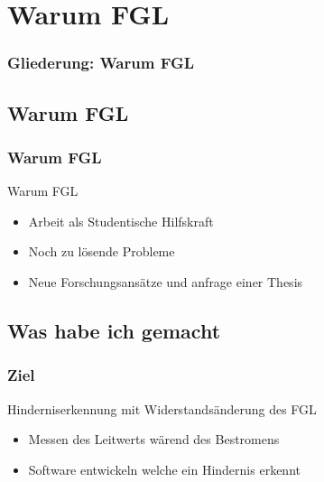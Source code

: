 \section{Warum FGL}

\begin{frame}[t]\frametitle{Gliederung: Warum FGL}
\tableofcontents[
currentsection,
subsectionstyle=show/show/hide
]
\end{frame}

\subsection{Warum FGL}
\label{thesis}
\begin{frame}[c]\frametitle{Warum FGL}
	Warum FGL
	\begin{itemize}
		\item{Arbeit als Studentische Hilfskraft}
		\item{Noch zu lösende Probleme }
		\item{Neue Forschungsansätze und anfrage einer Thesis}
	\end{itemize}
\end{frame}

\subsection{Was habe ich gemacht}
\label{eigenearbeit}
\begin{frame}[c]\frametitle{Ziel}
Hinderniserkennung mit Widerstandsänderung des FGL
\end{frame}

\begin{frame}
	\begin{itemize}
		\item{Messen des Leitwerts wärend des Bestromens}
		\item{Software entwickeln welche ein Hindernis erkennt}
	\end{itemize}
\end{frame}
